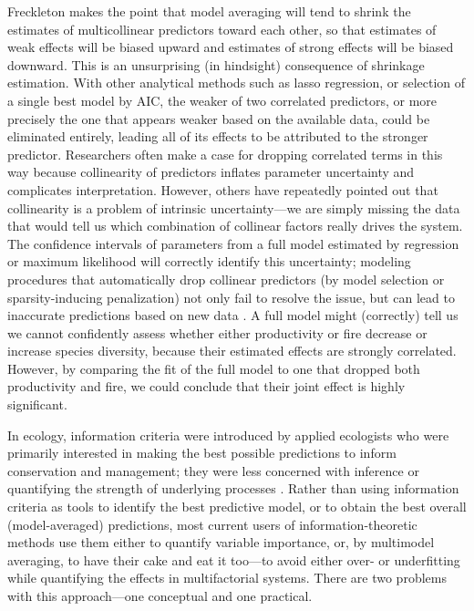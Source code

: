 \documentclass[entropy,article,accept,pdftex,moreauthors]{Definitions/mdpi}
\begin{document}
Freckleton \cite{ref-freckleton_dealing_2011} makes the point that model averaging will tend to
shrink the estimates of multicollinear predictors toward each other, so
that estimates of weak effects will be biased upward and estimates of
strong effects will be biased downward. This is an unsurprising (in hindsight)
consequence of shrinkage estimation. With other analytical methods such
as lasso regression, or selection of a single best model by AIC, the
weaker of two correlated predictors, or more precisely the one that
appears weaker based on the available data, could be eliminated
entirely, leading all of its effects to be attributed to the stronger
predictor. Researchers often make a case for dropping correlated terms
in this way because collinearity of predictors inflates parameter
uncertainty and complicates interpretation. However, others have
repeatedly pointed out that collinearity is a problem of intrinsic
uncertainty---we are simply missing the data that would tell us which
combination of collinear factors really drives the system. The
confidence intervals of parameters from a full model estimated by
regression or maximum likelihood will correctly identify this
uncertainty; modeling procedures that automatically drop collinear
predictors (by model selection or sparsity-inducing penalization) not
only fail to resolve the issue, but can lead to inaccurate predictions
based on new data \cite{ref-grahamConfronting2003,ref-morrisseyMultiple2018,ref-fengCollinearity2019a,ref-vanhoveCollinearity2021}.
A full model might (correctly) tell us we cannot
confidently assess whether either productivity or fire decrease or
increase species diversity, because their estimated effects are strongly
correlated. However, by comparing the fit of the full model to one that
dropped both productivity and fire, we could conclude that their joint
effect is highly significant.

In ecology, information criteria were introduced by applied ecologists
who were primarily interested in making the best possible predictions to
inform conservation and management; they were less concerned with
inference or quantifying the strength of underlying processes \cite{ref-BurnAnde98,ref-burnham_model_2002,ref-johnsonModel2004a}. Rather than using
information criteria as tools to identify the best predictive model, or
to obtain the best overall (model-averaged) predictions, most current
users of information-theoretic methods use them either to quantify
variable importance, or, by multimodel averaging, to have their cake and
eat it too---to avoid either over- or underfitting while quantifying the
effects in multifactorial systems. There are two problems with this
approach---one conceptual and one practical.
\end{document}
